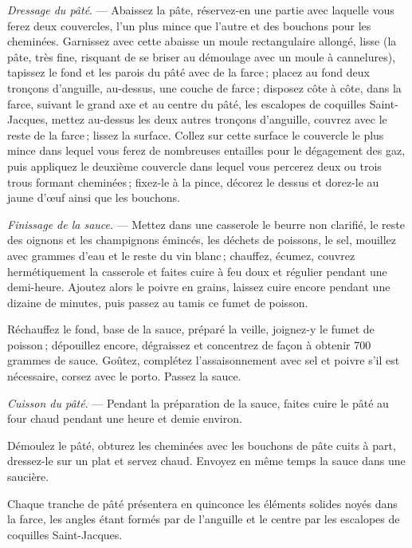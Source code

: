 \textit{Dressage du pâté}. — Abaissez la pâte, réservez-en une partie avec
laquelle vous ferez deux couvercles, l'un plus mince que l'autre et des
bouchons pour les cheminées. Garnissez avec cette abaisse un moule
rectangulaire allongé, lisse (la pâte, très fine, risquant de se briser au
démoulage avec un moule à cannelures), tapissez le fond et les parois du pâté
avec de la farce ; placez au fond deux tronçons d'anguille, au-dessus, une
couche de farce ; disposez côte à côte, dans la farce, suivant le grand axe et
au centre du pâté, les escalopes de coquilles Saint-Jacques, mettez au-dessus
les deux autres tronçons d'anguille, couvrez avec le reste de la farce ; lissez
la surface. Collez sur cette surface le couvercle le plus mince dans lequel
vous ferez de nombreuses entailles pour le dégagement des gaz, puis appliquez
le deuxième couvercle dans lequel vous percerez deux ou trois trous formant
cheminées ; fixez-le à la pince, décorez le dessus et dorez-le au jaune d'œuf
ainsi que les bouchons.

\medskip

\textit{Finissage de la sauce}. — Mettez dans une casserole le beurre non
clarifié, le reste des oignons et les champignons émincés, les déchets de
poissons, le sel, mouillez avec {\mmm} grammes d'eau et le reste du vin blanc ;
chauffez, écumez, couvrez hermétiquement la casserole et faites cuire à feu
doux et régulier pendant une demi-heure. Ajoutez alors le poivre en grains,
laissez cuire encore pendant une dizaine de minutes, puis passez au tamis ce
fumet de poisson.

Réchauffez le fond, base de la sauce, préparé la veille, joignez-y le fumet de
poisson ; dépouillez encore, dégraissez et concentrez de façon à obtenir 700
grammes de sauce. Goûtez, complétez l'assaisonnement avec sel et poivre s'il
est nécessaire, corsez avec le porto. Passez la sauce.

\medskip

\textit{Cuisson du pâté}. — Pendant la préparation de la sauce, faites cuire le
pâté au four chaud pendant une heure et demie environ.

Démoulez le pâté, obturez les cheminées avec les bouchons de pâte cuits à part,
dressez-le sur un plat et servez chaud. Envoyez en même temps la sauce dans une
saucière.

Chaque tranche de pâté présentera en quinconce les éléments solides noyés dans
la farce, les angles étant formés par de l'anguille et le centre par les
escalopes de coquilles Saint-Jacques.

